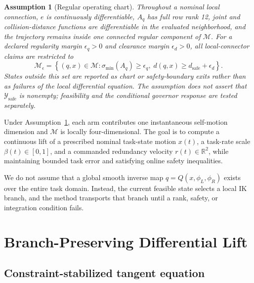 \documentclass[preprint,12pt]{elsarticle}
\newcommand{\R}{\mathbb{R}}
\newtheorem{assumption}{Assumption}
\begin{document}
\begin{assumption}[Regular operating chart]
\label{ass:regular}
Throughout a nominal local connection, $e$ is continuously differentiable, $A_q$ has full row rank 12, joint and collision-distance functions are differentiable in the evaluated neighborhood, and the trajectory remains inside one connected regular component of $\mathcal M$. For a declared regularity margin $\epsilon_q>0$ and clearance margin $\epsilon_d>0$, all local-connector claims are restricted to
\begin{equation}
\mathcal M_{\epsilon}
=
\left\{(q,x)\in\mathcal M:\sigma_{\min}(A_q)\geq\epsilon_q,\;
d(q,x)\geq d_{\mathrm{safe}}+\epsilon_d\right\}.
\label{eq:regular_contracted_set}
\end{equation}
States outside this set are reported as chart or safety-boundary exits rather than as failures of the local differential equation. The assumption does not assert that $\mathcal Y_{\mathrm{safe}}$ is nonempty; feasibility and the conditional governor response are tested separately.
\end{assumption}

Under Assumption~\ref{ass:regular}, each arm contributes one instantaneous self-motion dimension and $\mathcal M$ is locally four-dimensional. The goal is to compute a continuous lift of a prescribed nominal task-state motion $x(t)$, a task-rate scale $\beta(t)\in[0,1]$, and a commanded redundancy velocity $r(t)\in\R^2$, while maintaining bounded task error and satisfying online safety inequalities.

We do not assume that a global smooth inverse map $q=Q(x,\phi_L,\phi_R)$ exists over the entire task domain. Instead, the current feasible state selects a local IK branch, and the method transports that branch until a rank, safety, or integration condition fails.

\section{Branch-Preserving Differential Lift}
\label{sec:lift}

\subsection{Constraint-stabilized tangent equation}
\end{document}
